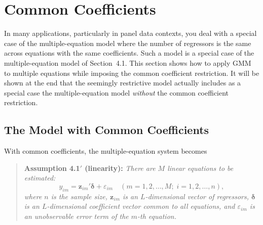 
\section{Common Coefficients}
\label{sec:4.6}

In many applications, particularly in panel data contexts, you deal with a special
case of the multiple-equation model where the number of regressors is the same
across equations with the same coefficients. Such a model is a special case of the
multiple-equation model of Section~4.1. This section shows how to apply GMM
to multiple equations while imposing the common coefficient restriction. It will be
shown at the end that the seemingly restrictive model actually includes as a special
case the multiple-equation model \textit{without} the common coefficient restriction.

\subsection*{The Model with Common Coefficients}

With common coefficients, the multiple-equation system becomes

\begin{quote}
\textbf{Assumption 4.1$'$ (linearity):}\quad
\textit{There are $M$ linear equations to be estimated:}
\begin{equation}
y_{im} = \mathbf{z}_{im}' \boldsymbol{\delta} + \varepsilon_{im}
\quad (m = 1, 2, \ldots, M;\; i = 1, 2, \ldots, n),
\label{eq:4.6.1}
\end{equation}
\textit{where $n$ is the sample size, $\mathbf{z}_{im}$ is an $L$-dimensional vector of
regressors, $\boldsymbol{\delta}$ is an $L$-dimensional coefficient vector common to all
equations, and $\varepsilon_{im}$ is an unobservable error term of the $m$-th equation.}
\end{quote}

